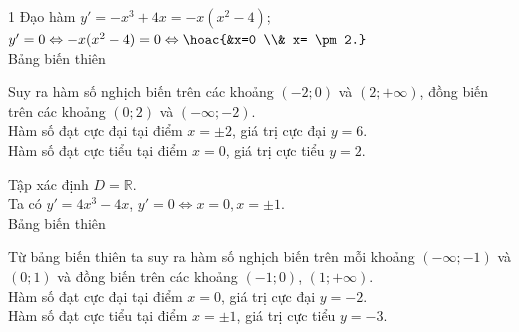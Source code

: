 \begin{bt}
{\begin{enumEX}{1}
			Đạo hàm $y'=-x^3+4x=-x(x^2-4)$; $y'=0 \Leftrightarrow-x(x^2-4)=0 \Leftrightarrow\hoac{&x=0 \\& x= \pm  2.}$\\
			Bảng  biến thiên
			\begin{center}
			\end{center}
			 Suy ra hàm số nghịch biến trên các khoảng $(-2;0)$ và $(2;+\infty)$, đồng biến trên các khoảng $(0;2)$ và $(-\infty;-2)$.\\
			Hàm số đạt cực đại tại điểm $x=  \pm 2$, giá trị cực đại $y=6$.\\
			Hàm số đạt cực tiểu tại  điểm $x=0$, giá trị cực tiểu $y=2$.
			\item Tập  xác định $D=\mathbb{R}$.\\
			Ta có $y'=4x^3-4x$, $y'=0 \Leftrightarrow  x=0, x= \pm 1$.\\
			Bảng  biến thiên
			\begin{center}
			\end{center}
			Từ bảng  biến thiên ta suy ra hàm số nghịch biến trên mỗi khoảng $(-\infty;-1)$ và $(0; 1)$ và đồng biến trên các khoảng $(-1;0)$, $(1;+\infty)$.\\
			Hàm số đạt cực đại tại điểm $x=0$, giá trị  cực đại $y=-2$.\\
			Hàm số đạt cực tiểu  tại điểm $x= \pm 1$, giá trị cực tiểu $y=-3$.
		\end{enumEX}
	} 
\end{bt}

